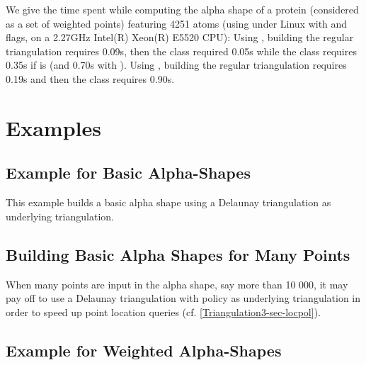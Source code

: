 We give the time spent while computing the alpha shape of a protein (considered
as a set of weighted points) featuring 4251 atoms (using  under Linux with 
and  flags, on a 2.27GHz Intel(R) Xeon(R) E5520 CPU): 
Using , building
the regular triangulation requires 0.09s, then the class 
required 0.05s while the class  requires 0.35s
if  is  (and 0.70s with ).
Using , building
the regular triangulation requires 0.19s and then the class  
requires 0.90s.




\section{Examples}
\subsection{Example for Basic Alpha-Shapes\label{I1_SectClassicAS3D}}

This example builds a basic alpha shape using a  Delaunay triangulation
as underlying triangulation.




\subsection{Building Basic Alpha Shapes for Many Points}
When many points are input in the alpha shape, say more than 10 000,
it may pay off to use a Delaunay triangulation with 
policy as underlying triangulation in order to speed up point location
queries (cf. \ref{Triangulation3-sec-locpol}).


\subsection{Example for Weighted Alpha-Shapes\label{I1_SectWeightedAS3D}}

